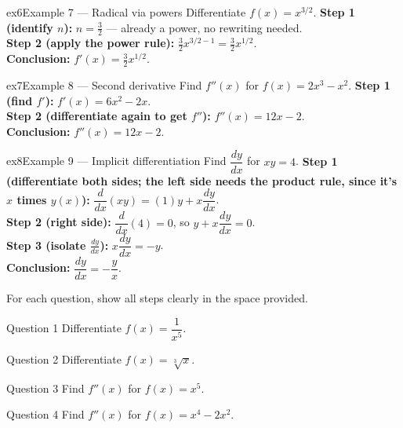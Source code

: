 \documentclass[11pt]{article}
\begin{document}
\begin{example}{ex6}{Example 7 --- Radical via powers}
Differentiate $f(x)=x^{3/2}$.\soln
\textbf{Step 1 (identify $n$):} $n=\tfrac32$ --- already a power, no rewriting needed.\\[3pt]
\textbf{Step 2 (apply the power rule):} $\tfrac32x^{3/2-1}=\tfrac32x^{1/2}$.\\[3pt]
\textbf{Conclusion:} $f'(x)=\tfrac32x^{1/2}$.
\end{example}

\begin{example}{ex7}{Example 8 --- Second derivative}
Find $f''(x)$ for $f(x)=2x^3-x^2$.\soln
\textbf{Step 1 (find $f'$):} $f'(x)=6x^2-2x$.\\[3pt]
\textbf{Step 2 (differentiate again to get $f''$):} $f''(x)=12x-2$.\\[3pt]
\textbf{Conclusion:} $f''(x)=12x-2$.
\end{example}

\begin{example}{ex8}{Example 9 --- Implicit differentiation}
Find $\dfrac{dy}{dx}$ for $xy=4$.\soln
\textbf{Step 1 (differentiate both sides; the left side needs the product rule, since it's $x$ times $y(x)$):} $\dfrac{d}{dx}(xy)=(1)y+x\dfrac{dy}{dx}$.\\[3pt]
\textbf{Step 2 (right side):} $\dfrac{d}{dx}(4)=0$, so $y+x\dfrac{dy}{dx}=0$.\\[3pt]
\textbf{Step 3 (isolate $\frac{dy}{dx}$):} $x\dfrac{dy}{dx}=-y$.\\[3pt]
\textbf{Conclusion:} $\dfrac{dy}{dx}=-\dfrac yx$.
\end{example}

\clearpage
{}
For each question, show all steps clearly in the space provided.

\begin{qbox}{Question 1}
Differentiate $f(x)=\dfrac1{x^5}$.\workspace{2.4cm}
\end{qbox}

\begin{qbox}{Question 2}
Differentiate $f(x)=\sqrt[3]{x}$.\workspace{2.4cm}
\end{qbox}

\begin{qbox}{Question 3}
Find $f''(x)$ for $f(x)=x^5$.\workspace{2.4cm}
\end{qbox}

\begin{qbox}{Question 4}
Find $f''(x)$ for $f(x)=x^4-2x^2$.\workspace{2.4cm}
\end{qbox}
\end{document}
